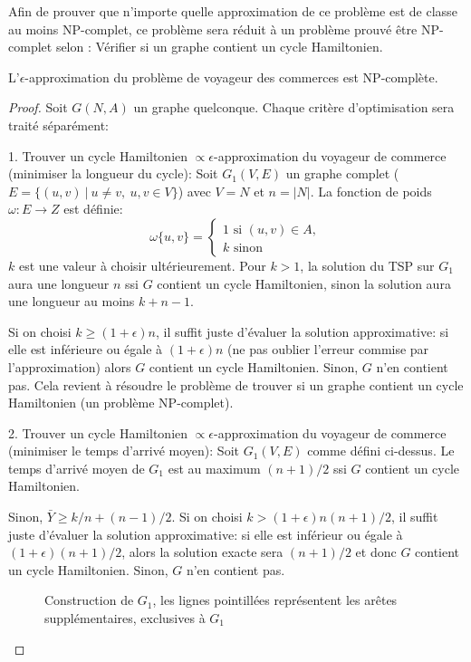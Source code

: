 \documentclass[../main.tex]{subfiles}
\begin{document}
Afin de prouver que n'importe quelle approximation de ce problème est de classe au moins NP-complet, ce problème sera réduit à un problème prouvé être NP-complet selon \cite{Karp1972}: Vérifier si un graphe contient un cycle Hamiltonien.

\begin{theorem}
L'$\epsilon$-approximation du problème de voyageur des commerces est NP-complète.
\end{theorem}

\begin{proof}
Soit $G(N,A)$ un graphe quelconque. Chaque critère d'optimisation sera traité séparément:

1. Trouver un cycle Hamiltonien $\propto \! \epsilon$-approximation du voyageur de commerce (minimiser la longueur du cycle): Soit $G_1(V, E)$ un graphe complet ($E = \{(u,v)\ |\ u \neq v,\ u,v \in V\}$) avec $V = N$ et $n = |N|$. La fonction de poids $\omega : E \rightarrow Z$ est définie:
\[
\omega \{u, v\} = \begin{cases}
\text{1 si } (u,v)\in A,\\
k \text{ sinon}
\end{cases}
\]
$k$ est une valeur à choisir ultérieurement. Pour $k > 1$, la solution du TSP sur $G_1$ aura une longueur $n$ ssi $G$ contient un cycle Hamiltonien, sinon la solution aura une longueur au moins $k + n -1$.

Si on choisi $k \geq (1+\epsilon)n$, il suffit juste d'évaluer la solution approximative: si elle est inférieure ou égale à $(1+ \epsilon)n$ (ne pas oublier l'erreur commise par l'approximation) alors $G$ contient un cycle Hamiltonien. Sinon, $G$ n'en contient pas. Cela revient à résoudre le problème de trouver si un graphe contient un cycle Hamiltonien (un problème NP-complet).

2. Trouver un cycle Hamiltonien $\propto \! \epsilon$-approximation du voyageur de commerce (minimiser le temps d'arrivé moyen): Soit $G_1(V,E)$ comme défini ci-dessus. Le temps d'arrivé moyen de $G_1$ est au maximum $(n+1)/2$ ssi $G$ contient un cycle Hamiltonien.

Sinon, $\bar{Y} \geq k/n + (n-1)/2$. Si on choisi $k > (1+\epsilon)n(n+1)/2$, il suffit juste d'évaluer la solution approximative: si elle est inférieur ou égale à $(1+\epsilon)(n+1)/2$, alors la solution exacte sera $(n+1)/2$ et donc $G$ contient un cycle Hamiltonien. Sinon, $G$ n'en contient pas.

\begin{figure}[ht]
    \centering
    \caption{Construction de $G_1$, les lignes pointillées représentent les arêtes supplémentaires, exclusives à $G_1$}
    \label{fig:epsi_approx}
\end{figure}


\end{proof}
\end{document}
